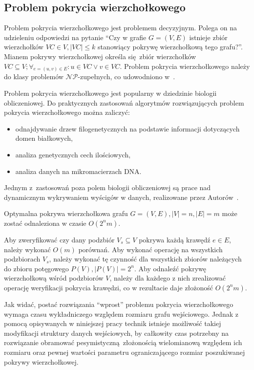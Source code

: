 \subsection{Problem pokrycia wierzchołkowego}\label{s_vertex_cover_domain}
\par{
  Problem pokrycia wierzchołkowego jest problemem decyzyjnym.
  Polega on na udzieleniu odpowiedzi na pytanie ``Czy w grafie $G=(V,E)$
  istnieje zbiór wierzchołków $VC \in V, |VC| \leq k$ stanowiący pokrywę 
  wierzchołkową tego grafu?''.
  Mianem pokrywy wierzchołkowej określa się zbiór wierzchołków $VC
  \subseteq V; \forall_{e=(u,v) \in E}:u\in VC\lor v\in VC$.
  Problem pokrycia wierzchołkowego należy do klasy problemów 
  $\mathcal{NP}$-zupełnych, co udowodniono w~\cite{Kar72}.
}
\par{
  Problem pokrycia wierzchołkowego jest popularny w dziedzinie biologii
  obliczeniowej. 
  Do praktycznych zastosowań algorytmów rozwiązujących problem pokrycia
  wierzchołkowego można zaliczyć:
  \begin{itemize}
    \item odnajdywanie drzew filogenetycznych na podstawie informacji
      dotyczących domen białkowych,
    \item analiza genetycznych cech ilościowych,
    \item analiza danych na mikromacierzach DNA.\@
  \end{itemize}

  Jednym z~zastosowań poza polem biologii obliczeniowej są prace nad dynamicznym
  wykrywaniem wyścigów w danych, realizowane przez 
  Autorów~\cite{O'Callahan:2003:HDD:781498.781528}.
}
\begin{theorem}
  Optymalna pokrywa wierzchołkowa grafu $G=(V,E), |V|=n, |E|=m$ może zostać 
  odnaleziona w czasie $O(2^{n}m)$.
\end{theorem}
\begin{bproof}
  Aby zweryfikować czy dany podzbiór $V_s \subseteq V$ pokrywa każdą krawędź
  $e \in E$, należy wykonać $O(m)$ porównań.
  Aby wykonać operację na wszystkich podzbiorach $V_s$, należy wykonać tę
  czynność dla wszystkich zbiorów należących do zbioru potęgowego 
  $P(V), |P(V)| = 2^{n}$.
  Aby odnaleźć pokrywę wierzchołkową wśród podzbiorów $V$, należy dla każdego z
  nich zrealizować operację weryfikacji pokrycia krawędzi, co w rezultacie daje 
  złożoność $O(2^{n}m)$.
\end{bproof}
\par{
  Jak widać, postać rozwiązania ``wprost'' problemu pokrycia wierzchołkowego wymaga czasu wykładniczego względem rozmiaru grafu wejściowego.
  Jednak z pomocą opisywanych w niniejszej pracy technik istnieje możliwość takiej modyfikacji struktury danych wejściowych, by całkowity czas potrzebny na rozwiązanie obramować pesymistyczną~złożonością wielomianową względem ich rozmiaru oraz pewnej wartości parametru ograniczającego rozmiar poszukiwanej pokrywy wierzchołkowej.
}
